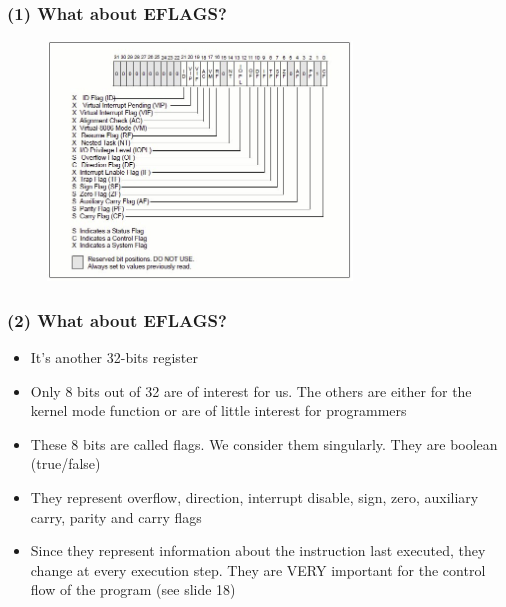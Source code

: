 \documentclass[]{beamer}
\begin{document}
		\begin{frame}
			\frametitle{(1) What about EFLAGS?}
			\begin{figure}
				\includegraphics[height=2.5in]{images/eflags.jpeg}
				\label{Eflags idea}
			\end{figure}
		\end{frame}
		\begin{frame}
			\frametitle{(2) What about EFLAGS?}
			\begin{itemize}
				\item{It's another 32-bits register}
				\item{Only 8 bits out of 32 are of interest for us. The others are either for the kernel mode function or  are of little interest for programmers}
				\item{These 8 bits are called flags. We consider them singularly. They are boolean (true/false) }
				\item{They represent overflow, direction, interrupt disable, sign, zero, auxiliary carry, parity and carry flags}
				\item{Since they represent information about the instruction last executed, they change at every execution step. They are VERY important for the control flow of the program (see slide 18)}				
			\end{itemize}
		\end{frame}
\end{document}
